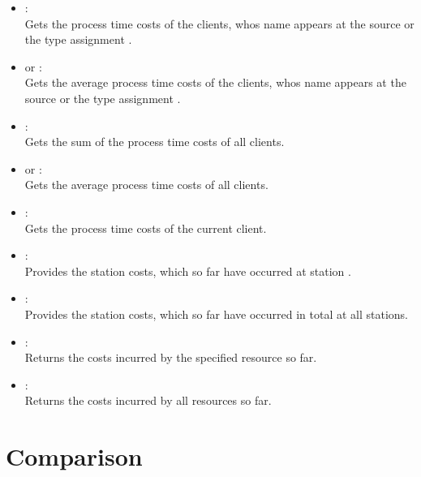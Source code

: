 \begin{itemize}
\item
{}:\\
Gets the process time costs of the clients, whos name appears at the source or the type assignment .

\item
{} or :\\
Gets the average process time costs of the clients, whos name appears at the source or the type assignment .

\item
{}:\\
Gets the sum of the process time costs of all clients.

\item
{} or :\\
Gets the average process time costs of all clients.

\item
{}:\\
Gets the process time costs of the current client.

\item
{}:\\
Provides the station costs, which so far have occurred at station .

\item
{}:\\
Provides the station costs, which so far have occurred in total at all stations.

\item
{}:\\
Returns the costs incurred by the specified resource so far.

\item
{}:\\
Returns the costs incurred by all resources so far.

\end{itemize}



\chapter{Comparison}

